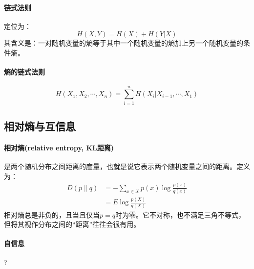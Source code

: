 \documentclass[10pt,letterpaper]{article}
\begin{document}
\paragraph{链式法则} 定位为：\\
\begin{equation}
	H(X,Y) = H(X) + H(Y|X)
\end{equation}
其含义是：一对随机变量的熵等于其中一个随机变量的熵加上另一个随机变量的条件熵。

\paragraph{熵的链式法则}
\begin{equation}
	H(X_1,X_2,\cdots, X_n) = \sum_{i=1}^n H(X_i|X_{i-1}, \cdots, X_1)
\end{equation}

\subsection{相对熵与互信息}
\paragraph{相对熵(relative entropy, KL距离)}是两个随机分布之间距离的度量，也就是说它表示两个随机变量之间的距离。定义为：\\
\begin{equation}
	\begin{split}
		D(p \parallel q) &= -\sum_{x\in X} p(x)\log{\frac{p(x)}{q(x)}} \\
		&= E \log{\frac{p(X)}{q(X)}}
	\end{split}
\end{equation}
相对熵总是非负的，且当且仅当$p=q$时为零。它不对称，也不满足三角不等式，但将其视作分布之间的“距离”往往会很有用。
\paragraph{自信息} ?
\end{document}
